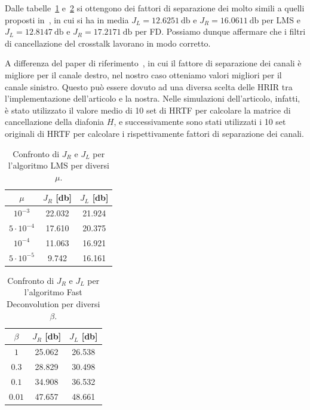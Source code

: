 \documentclass[12pt,a4paper,titlepage]{article}
\begin{document}
Dalle tabelle~\ref{tab:LMS_result} e~\ref{tab:FD_result} si ottengono dei fattori di separazione dei molto simili a quelli proposti in~\cite{Li:comprehensive_comparison}, in cui si ha in media $J_L = \SI{12.6251}{\decibel}$ e $J_R = \SI{16.0611}{\decibel}$ per LMS e $J_L = \SI{12.8147}{\decibel}$ e $J_R = \SI{17.2171}{\decibel}$ per FD. Possiamo dunque affermare che i filtri di cancellazione del crosstalk lavorano in modo corretto.

A differenza del paper di riferimento~\cite{Li:comprehensive_comparison}, in cui il fattore di separazione dei canali è migliore per il canale destro, nel nostro caso otteniamo valori migliori per il canale sinistro. Questo può essere dovuto ad una diversa scelta delle HRIR tra l'implementazione dell'articolo e la nostra. Nelle simulazioni dell'articolo, infatti, è stato utilizzato il valore medio di 10 set di HRTF per calcolare la matrice di cancellazione della diafonia $H$, e successivamente sono stati utilizzati i 10 set originali di HRTF per calcolare i rispettivamente fattori di separazione dei canali.

\begin{table}[h]
\centering
\begin{tabular}{c c c}
\toprule
$\mu$   & $J_R$ [\si{\decibel}]   & $J_L$ [\si{\decibel}]   \\ \midrule
$10^{-3}$ & 22.032 & 21.924 \\
$5\cdot10^{-4}$ & 17.610 & 20.375 \\
$10^{-4}$& 11.063 & 16.921 \\
$5\cdot10^{-5}$ & 9.742  & 16.161 \\ \bottomrule
\end{tabular}
\caption{\label{tab:LMS_result}Confronto di $J_R$ e $J_L$ per l'algoritmo LMS per diversi $\mu$.}
\end{table}

\begin{table}[h]
\centering
\begin{tabular}{c c c}
\toprule
$\beta$   & $J_R$ [\si{\decibel}]   & $J_L$ [\si{\decibel}]   \\ \midrule
$1$ &  25.062 &  26.538\\
$0.3$ &  28.829 &  30.498\\
$0.1$&  34.908 & 36.532 \\
$0.01$ &  47.657 &  48.661 \\ \bottomrule
\end{tabular}
\caption{\label{tab:FD_result}Confronto di $J_R$ e $J_L$ per l'algoritmo Fast Deconvolution per diversi $\beta$.}
\end{table}
\end{document}
